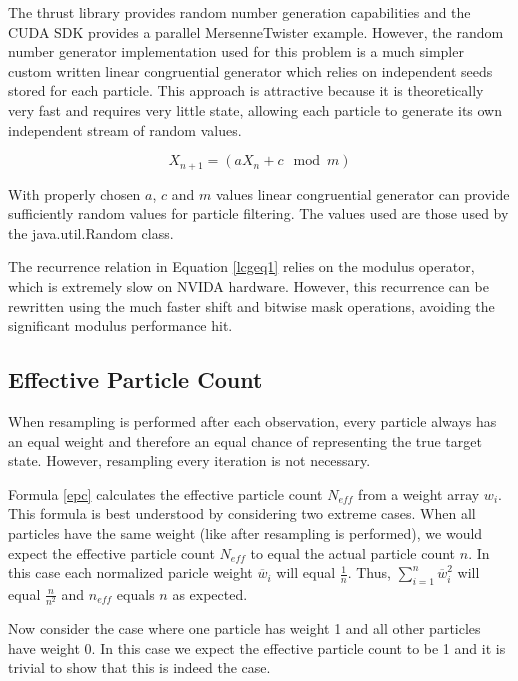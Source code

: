 \documentclass{article}
\begin{document}
The thrust library provides random number generation capabilities and the CUDA SDK provides a parallel MersenneTwister example. However, the random number generator implementation used for this problem is a much simpler custom written linear congruential generator which relies on independent seeds stored for each particle. This approach is attractive because it is theoretically very fast and requires very little state, allowing each particle to generate its own independent stream of random values.

\begin{equation}\label{lcgeq1}
X_{n+1}=(aX_{n}+c \mod m)
\end{equation}

With properly chosen \(a\), \(c\) and \(m\) values linear congruential generator can provide sufficiently random values for particle filtering.\cite{lcg} The values used are those used by the java.util.Random class.

The recurrence relation in Equation \ref{lcgeq1} relies on the modulus operator, which is extremely slow on NVIDA hardware.\cite{oprc} However, this recurrence can be rewritten using the much faster shift and bitwise mask operations, avoiding the significant modulus performance hit.

\subsection{Effective Particle Count}
When resampling is performed after each observation, every particle always has an equal weight and therefore an equal chance of representing the true target state. However, resampling every iteration is not necessary.

Formula \ref{epc} calculates the effective particle count \(N_{eff}\) from a weight array \(w_{i}\).\cite{pf} This formula is best understood by considering two extreme cases. When all particles have the same weight (like after resampling is performed), we would expect the effective particle count \(N_{eff}\) to equal the actual particle count \(n\). In this case each normalized paricle weight \(\overline{w}_{i}\) will equal \(\frac{1}{n}\). Thus, \( \sum_{i=1}^{n} \overline{w}_{i}^2 \) will equal \(\frac{n}{n^{2}}\) and \(n_{eff}\) equals \(n\) as expected.

Now consider the case where one particle has weight 1 and all other particles have weight 0. In this case we expect the effective particle count to be 1 and it is trivial to show that this is indeed the case.
\end{document}
